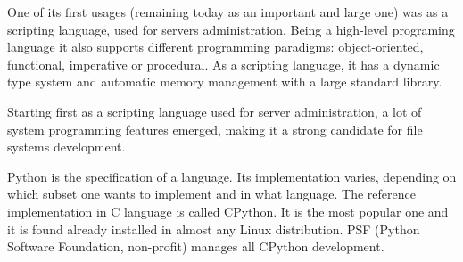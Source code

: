     One of its first usages (remaining today as an important and large one) was as a scripting language, used for servers administration. Being a high-level programing language it also supports different programming paradigms: object-oriented, functional, imperative or procedural. As a scripting language, it has a dynamic type system and automatic memory management with a large standard library.

    Starting first as a scripting language used for server administration, a lot of system programming features emerged, making it a strong candidate for file systems development.

    Python is the specification of a language. Its implementation varies, depending on which subset one wants to implement and in what language. The reference implementation in C language is called CPython. It is the most popular one and it is found already installed in almost any Linux distribution. PSF (Python Software Foundation, non-profit) manages all CPython development.


